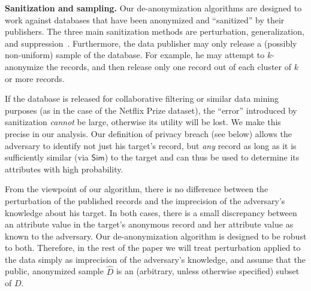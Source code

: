 \documentclass[11pt]{article}
\newcommand{\Sim}{\textsf{Sim}}
\begin{document}
\vspace{1ex}
\noindent
\textbf{Sanitization and sampling.}
Our de-anonymization algorithms are designed to work against databases
that have been anonymized and ``sanitized'' by their publishers.
The three main sanitization methods are perturbation, generalization, and
suppression~\cite{sweeney-supp,ciriani}.  Furthermore, the data publisher
may only release a (possibly non-uniform) sample of the database.
For example, he may attempt to $k$-anonymize the records, and then
release only one record out of each cluster of $k$ or more records.


If the database is released for collaborative filtering or similar
data mining purposes (as in the case of the Netflix Prize dataset), the
``error'' introduced by sanitization \emph{cannot} be large, otherwise
its utility will be lost.  We make this precise in our analysis.
Our definition of privacy breach (see below) allows the adversary to
identify not just his target's record, but \emph{any} record as long as
it is sufficiently similar (via $\Sim$) to the target and can thus be
used to determine its attributes with high probability.


From the viewpoint of our algorithm, there is no difference between
the perturbation of the published records and the imprecision of the
adversary's knowledge about his target.  In both cases, there is a small
discrepancy between an attribute value in the target's anonymous record
and her attribute value as known to the adversary.  Our de-anonymization
algorithm is designed to be robust to both.  Therefore, in the rest
of the paper we will treat perturbation applied to the data simply as
imprecision of the adversary's knowledge, and assume that the public,
anonymized sample ${\hat D}$ is an (arbitrary, unless otherwise specified)
subset of $D$.
\end{document}
